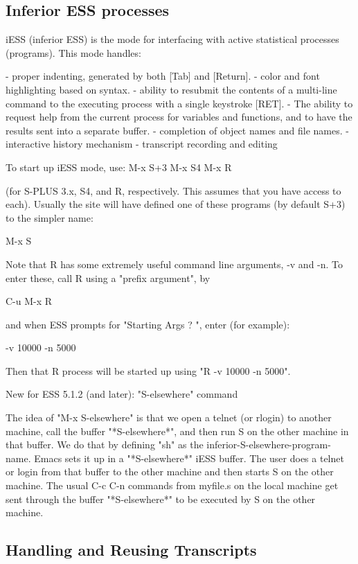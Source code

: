 \documentclass{article}
\begin{document}
\subsection{Inferior ESS processes}
\label{sec:S:inf}

iESS (inferior ESS) is the mode for interfacing with active
statistical processes (programs).  This mode handles:

- proper indenting, generated by both [Tab] and [Return].
- color and font highlighting based on syntax.
- ability to resubmit the contents of a multi-line command
  to the executing process with a single keystroke [RET].
- The ability to request help from the current process for variables
  and functions, and to have the results sent into a separate buffer.
- completion of object names and file names.
- interactive history mechanism
- transcript recording and editing

To start up iESS mode, use:
   M-x S+3 
   M-x S4
   M-x R

(for S-PLUS 3.x, S4, and R, respectively.  This assumes that you have
access to each).  Usually the site will have defined one of these programs
(by default S+3) to the simpler name:

   M-x S

Note that R has some extremely useful command line arguments, 
-v and -n.   To enter these, call R using a "prefix argument", by

   C-u M-x R

and when ESS prompts for "Starting Args ? ", enter (for example):

   -v 10000 -n 5000

Then that R process will be started up using "R -v 10000 -n 5000".

New for ESS 5.1.2 (and later):  "S-elsewhere" command

  The idea of "M-x S-elsewhere" is that we open a telnet (or rlogin)
  to another machine, call the buffer "*S-elsewhere*", and then run S
  on the other machine in that buffer.  We do that by defining "sh" as
  the inferior-S-elsewhere-program-name.  Emacs sets it up in a
  "*S-elsewhere*" iESS buffer.  The user does a telnet or login from
  that buffer to the other machine and then starts S on the other
  machine.  The usual C-c C-n commands from myfile.s on the local
  machine get sent through the buffer "*S-elsewhere*" to be executed
  by S on the other machine.
                           

\subsection{Handling and Reusing Transcripts}
\label{sec:S:trans}
\end{document}
